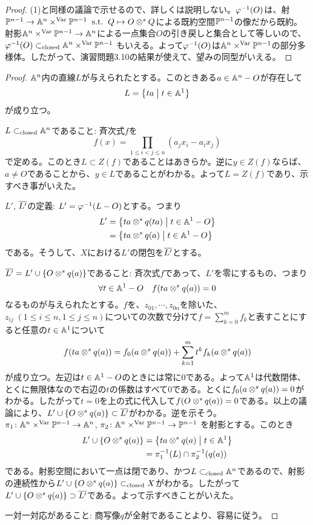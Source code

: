 \begin{proof}
  (1)と同様の議論で示せるので、詳しくは説明しない。$\vp^{-1}(O)$は、射$\P^{n-1} \to \A^n \vartm \P^{n-1} \st Q \mapsto O \ts^s Q$による既約空間$\P^{n-1}$の像だから既約。射影$\A^n \vartm \P^{n-1} \to \A^n$による一点集合$O$の引き戻しと集合として等しいので、$\vp^{-1}(O) \clsub \A^n \vartm \P^{n-1}$
  もいえる。よって$\vp^{-1}(O)$は$\A^n \vartm \P^{n-1}$の部分多様体。したがって、演習問題3.10の結果が使えて、望みの同型がいえる。
\end{proof}





\begin{proof}
  $\A^n$内の直線$L$が与えられたとする。このときある$a \in \A^n - O$が存在して
  \[
  L = \setmid{ta}{t \in \A^1 }
  \]
  が成り立つ。

  $L \clsub \A^n$であること: 斉次式$f$を
  \[
  f(x) = \prod_{1 \leq i < j \leq n} (a_j x_i - a_i x_j)
  \]
  で定める。このとき$L \subset Z(f)$であることはあきらか。逆に$y \in Z(f)$ならば、$a \neq O$であることから、$y \in L$であることがわかる。よって$L = Z(f)$であり、示すべき事がいえた。

  $L'$, $\ol{L'}$の定義: $L' = \vp^{-1}(L - O)$とする。つまり
  \begin{align*}
  L' &= \setmid{ta \ts^s q(ta)}{t \in \A^1 - O} \\
  &= \setmid{ta \ts^s q(a)}{t \in \A^1 - O}
\end{align*}
  である。そうして、$X$における$L'$の閉包を$\ol{L'}$とする。

  $\ol{L'} = L' \cup \{ O \ts^s q(a) \}$であること: 斉次式$f$であって、$L'$を零にするもの、つまり
  \[
  \forall t \in \A^1 - O \quad f(ta \ts^s q(a)) = 0
  \]
  なるものが与えられたとする。$f$を、$z_{01}, \cdots , z_{0n}$を除いた、$z_{ij} \; (1 \leq i \leq n, 1 \leq j \leq n)$についての次数で分けて$f = \sum_{k=0 }^{m} f_k$と表すことにすると任意の$t \in \A^1$について
  \[
  f(ta \ts^s q(a)) = f_0(a \ts^s q(a)) + \sum_{k=1}^m t^k f_k(a \ts^s q(a))
  \]
  が成り立つ。左辺は$t \in \A^1 - O$のときには常に$0$である。よって$\A^1$は代数閉体、とくに無限体なので右辺の$t$の係数はすべて$0$である。とくに$f_0(a \ts^s q(a))=0$がわかる。したがって$t=0$を上の式に代入して$f(O \ts^s q(a)) = 0$である。以上の議論により、$L' \cup \{ O \ts^s q(a) \} \subset \ol{L'}$がわかる。逆を示そう。$\pi_1 \colon \A^n \vartm \P^{n-1} \to \A^n$, $\pi_2 \colon \A^n \vartm \P^{n-1} \to \P^{n-1}$
  を射影とする。このとき
  \begin{align*}
  L' \cup \{ O \ts^s q(a) \} &= \setmid{ta \ts^s q(a)}{t \in \A^1} \\
  &= \pi_1^{-1}(L) \cap \pi_2^{-1}(q(a))
\end{align*}
である。射影空間において一点は閉であり、かつ$L \clsub \A^n$であるので、射影の連続性から$L' \cup \{ O \ts^s q(a) \} \clsub X$がわかる。したがって$L' \cup \{ O \ts^s q(a) \} \supset \ol{L'}$である。よって示すべきことがいえた。

一対一対応があること: 商写像$q$が全射であることより、容易に従う。
\end{proof}
